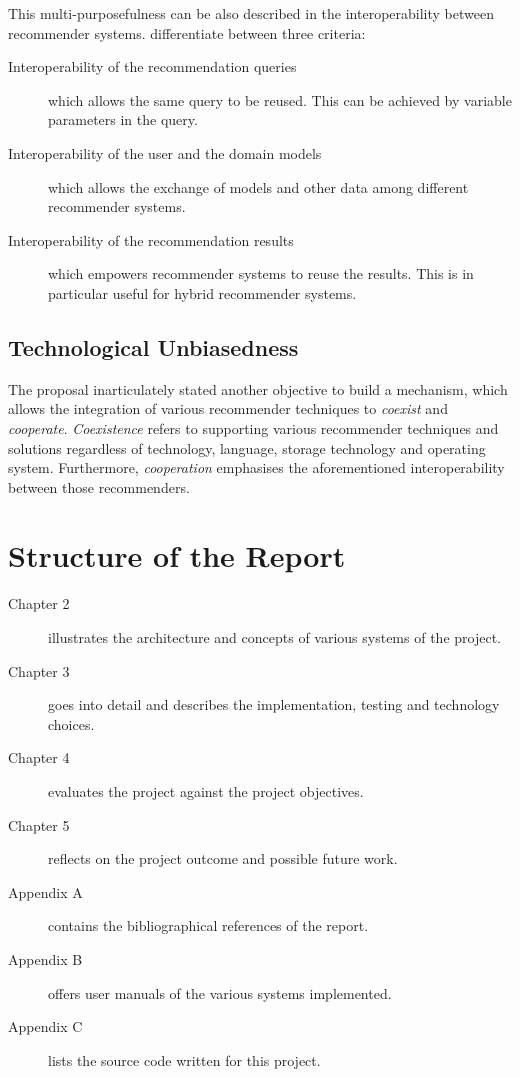 This multi-purposefulness can be also described in the interoperability between recommender systems. \citet{manouselis07} differentiate between three criteria:

\begin{description}
    \item[Interoperability of the recommendation queries] which allows the same query to be reused. This can be achieved by variable parameters in the query.
    \item[Interoperability of the user and the domain models] which allows the exchange of models and other data among different recommender systems.
    \item[Interoperability of the recommendation results] which empowers recommender systems to reuse the results. This is in particular useful for hybrid recommender systems.
\end{description}

\subsection{Technological Unbiasedness}

The proposal inarticulately stated another objective to build a mechanism, which allows the integration of various recommender techniques to \emph{coexist} and \emph{cooperate}. \emph{Coexistence} refers to supporting various recommender techniques and solutions regardless of technology, language, storage technology and operating system. Furthermore, \emph{cooperation} emphasises the aforementioned interoperability between those recommenders.

\section{Structure of the Report}

\begin{description}
    \item[Chapter 2] illustrates the architecture and concepts of various systems of the project.
    \item[Chapter 3] goes into detail and describes the implementation, testing and technology choices.
    \item[Chapter 4] evaluates the project against the project objectives.
    \item[Chapter 5] reflects on the project outcome and possible future work.
    \item[Appendix A] contains the bibliographical references of the report.
    \item[Appendix B] offers user manuals of the various systems implemented.
    \item[Appendix C] lists the source code written for this project.
\end{description}